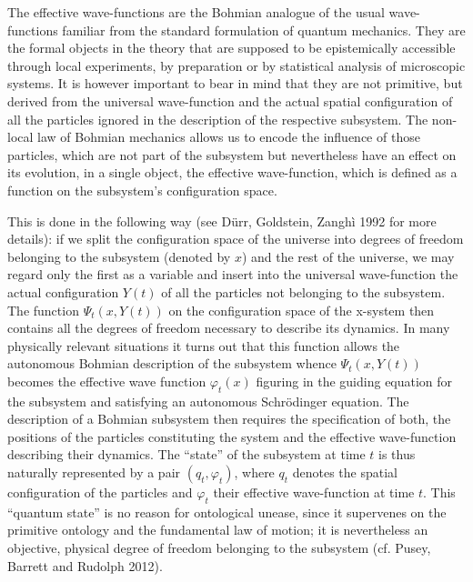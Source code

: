 \documentclass[12pt,a4paper]{article}
\theoremstyle{definition}
\begin{document}
The effective wave-functions are the Bohmian analogue of the usual wave-functions familiar from the standard formulation of quantum mechanics. They are the formal objects in the theory that are supposed to be epistemically accessible through local experiments, by preparation or by statistical analysis of microscopic systems. It is however important to bear in mind that they are not primitive, but derived from the universal wave-function and the actual spatial configuration of all the particles ignored in the description of the respective subsystem. The non-local law of Bohmian mechanics allows us to encode the influence of those particles, which are not part of the subsystem but nevertheless have an effect on its evolution, in a single object, the effective wave-function, which is defined as a function on the subsystem's configuration space.

This is done in the following way (see D\"urr, Goldstein, Zangh\`i 1992 for more details): if we split the configuration space of the universe into degrees of freedom belonging to the subsystem (denoted by $x$) and the rest of the universe, we may regard only the first as a variable and insert into the universal wave-function the actual configuration $Y(t)$ of all the particles not belonging to the subsystem. The function $\Psi_t(x,Y(t))$ on the configuration space of the x-system then contains all the degrees of freedom necessary to describe its dynamics. In many physically relevant situations it turns out that this function allows the autonomous Bohmian description of the subsystem whence $\Psi_t(x,Y(t))$ becomes the effective wave function $\varphi_t(x)$ figuring in the guiding equation for the subsystem and satisfying an autonomous Schr\"odinger equation. The description of a Bohmian subsystem then requires the specification of both, the positions of the particles constituting the system and the effective wave-function describing their dynamics. The ``state'' of the subsystem at time $t$ is thus naturally represented by a pair $(q_t, \varphi_t)$, where $q_t$ denotes the spatial configuration of the particles and $\varphi_t$ their effective wave-function at time $t$. This ``quantum state'' is no reason for ontological unease, since it supervenes on the primitive ontology and the fundamental law of motion; it is nevertheless an objective, physical degree of freedom belonging to the subsystem (cf. Pusey, Barrett and Rudolph 2012).
\end{document}
